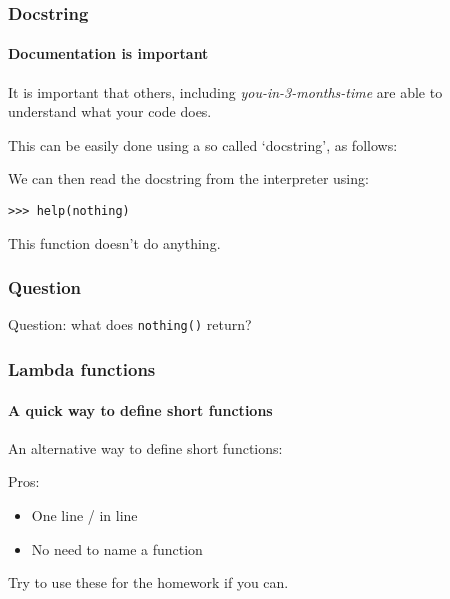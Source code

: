 \begin{frame}\frametitle{Docstring}
    \framesubtitle{Documentation is important}

    It is important that others, including \emph{you-in-3-months-time} are able
    to understand what your code does.

    This can be easily done using a so called `docstring', as follows:


    \pause

    We can then read the docstring from the interpreter using:

    \vfill

    \texttt{>>> help(nothing)}

    This function doesn't do anything.

\end{frame}

\begin{frame}\frametitle{Question}
    \vfill
    Question: what does \texttt{nothing()} return?
\end{frame}

\begin{frame}\frametitle{Lambda functions}
    \framesubtitle{A quick way to define short functions}

    An alternative way to define short functions:


    \vfill

    Pros:
    \begin{itemize}
        \item One line / in line
        \item No need to name a function
    \end{itemize}

    Try to use these for the homework if you can.

\end{frame}





